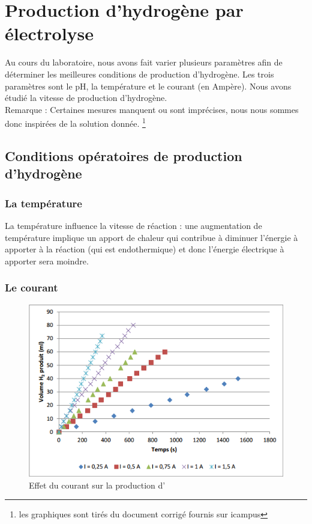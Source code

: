 \section{Production d'hydrogène par électrolyse}

Au cours du laboratoire, nous avons fait varier plusieurs paramètres afin de déterminer les meilleures conditions de production d'hydrogène. Les trois paramètres sont le pH, la température et le courant (en Ampère). Nous avons étudié la vitesse de production d'hydrogène.
\\

Remarque : Certaines mesures manquent ou sont imprécises, nous nous sommes donc inspirées de la solution donnée. \footnote{les graphiques sont tirés du document corrigé fournis sur icampus}

\subsection{Conditions opératoires de production d'hydrogène}

\subsubsection{La température}

La température influence la vitesse de réaction : une augmentation de température implique un apport de chaleur qui contribue à diminuer l'énergie à apporter à la réaction (qui est endothermique) et donc l'énergie électrique à apporter sera moindre.



\subsubsection{Le courant}

\begin{figure}
\begin{center}
\includegraphics[scale=0.7]{task7/PRODUCTIONHYDRO.png} 
\end{center}
\caption{Effet du courant sur la production d'}
\label{courant-H2}
\end{figure}

